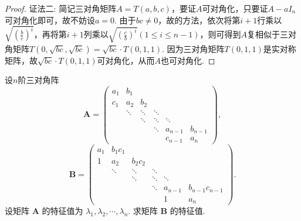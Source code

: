 \documentclass[../../main.tex]{subfiles}%
\begin{document}
\begin{proof}
{\color{blue}证法二:}
简记三对角矩阵\(A = T(a,b,c)\)，要证\(A\)可对角化，只要证\(A - aI_n\)可对角化即可，故不妨设\(a = 0\). 由于\(bc\neq0\)，故的方法，依次将第\(i + 1\)行乘以\(\sqrt{\left(\frac{b}{c}\right)^i}\)，再将第\(i + 1\)列乘以\(\sqrt{\left(\frac{c}{b}\right)^i}(1\leqslant  i\leqslant  n - 1)\)，则可得到\(A\)复相似于三对角矩阵\(T(0,\sqrt{bc},\sqrt{bc})=\sqrt{bc}\cdot T(0,1,1)\). 因为三对角矩阵\(T(0,1,1)\)是实对称矩阵，故\(\sqrt{bc}\cdot T(0,1,1)\)可对角化，从而\(A\)也可对角化. 
\end{proof}

\begin{example}
设$n$阶三对角阵
\[
\boldsymbol{A} = \begin{pmatrix} a_1 & b_1 \\ c_1 & a_2 & b_2 \\ & \ddots & \ddots & \ddots \\ & & \ddots & \ddots & \ddots \\ & & & \ddots & a_{n - 1} & b_{n - 1} \\ & & & & c_{n - 1} & a_n \end{pmatrix},
\]
\[
\boldsymbol{B} = \begin{pmatrix} a_1 & b_1c_1 \\ 1 & a_2 & b_2c_2 \\ & \ddots & \ddots & \ddots \\ & & \ddots & \ddots & \ddots \\ & & & \ddots & a_{n - 1} & b_{n - 1}c_{n - 1} \\ & & & & 1 & a_n \end{pmatrix}.
\]
设矩阵 \(\boldsymbol{A}\) 的特征值为 \(\lambda_1, \lambda_2, \cdots, \lambda_n\). 求矩阵 \(\boldsymbol{B}\) 的特征值.
\end{example}
\end{document}
